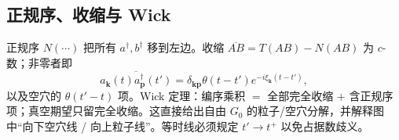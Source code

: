 \subsection{正规序、收缩与 Wick}

正规序 $N(\cdots)$ 把所有 $a^\dagger,b^\dagger$ 移到左边。收缩 $\overline{AB}=T(AB)-N(AB)$ 为 $c$-数；非零者即
\begin{equation}
  \overline{a_{\mathbf{k}}(t)a_{\mathbf{p}}^\dagger(t')}
  =\delta_{\mathbf{k}\mathbf{p}}\theta(t-t')e^{-i\xi_{\mathbf{k}}(t-t')},
\end{equation}
以及空穴的 $\theta(t'-t)$ 项。Wick 定理：编序乘积 $=$ 全部完全收缩 $+$ 含正规序项；真空期望只留完全收缩。这直接给出自由 $G_0$ 的粒子/空穴分解，并解释图中“向下空穴线 / 向上粒子线”。等时线必须规定 $t'\to t^+$ 以免占据数歧义。
